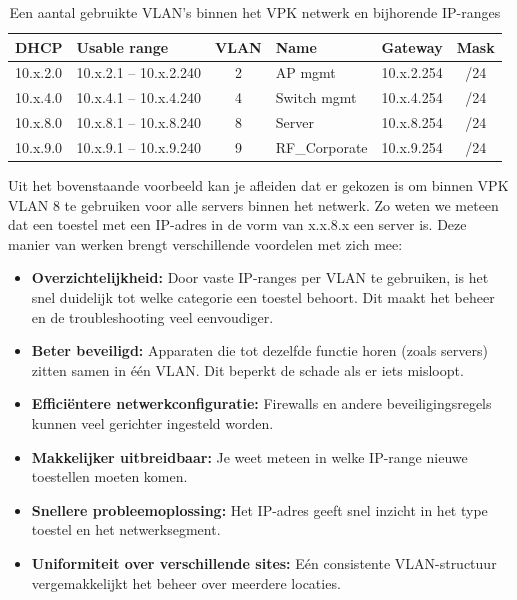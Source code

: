 \begin{table}[h!]
    \centering
    \begin{tabular}{|l|l|c|l|l|c|}
        \hline
        \textbf{DHCP} & \textbf{Usable range} & \textbf{VLAN} & \textbf{Name} & \textbf{Gateway} & \textbf{Mask} \\
        \hline
        10.x.2.0 & 10.x.2.1 -- 10.x.2.240 & 2 & AP mgmt & 10.x.2.254 & /24 \\
        10.x.4.0 & 10.x.4.1 -- 10.x.4.240 & 4 & Switch mgmt & 10.x.4.254 & /24 \\
        10.x.8.0 & 10.x.8.1 -- 10.x.8.240 & 8 & Server & 10.x.8.254 & /24 \\
        10.x.9.0 & 10.x.9.1 -- 10.x.9.240 & 9 & RF\_Corporate & 10.x.9.254 & /24 \\
        \hline
    \end{tabular}
    \caption{Een aantal gebruikte VLAN's binnen het VPK netwerk en bijhorende IP-ranges}
\end{table}

Uit het bovenstaande voorbeeld kan je afleiden dat er gekozen is om binnen VPK VLAN 8 te gebruiken voor alle servers binnen het netwerk. Zo weten we meteen dat een toestel met een IP-adres in de vorm van x.x.8.x een server is. Deze manier van werken brengt verschillende voordelen met zich mee:

\begin{itemize}
    \item \textbf{Overzichtelijkheid:} Door vaste IP-ranges per VLAN te gebruiken, is het snel duidelijk tot welke categorie een toestel behoort. Dit maakt het beheer en de troubleshooting veel eenvoudiger.
    \item \textbf{Beter beveiligd:} Apparaten die tot dezelfde functie horen (zoals servers) zitten samen in één VLAN. Dit beperkt de schade als er iets misloopt.
    \item \textbf{Efficiëntere netwerkconfiguratie:} Firewalls en andere beveiligingsregels kunnen veel gerichter ingesteld worden.
    \item \textbf{Makkelijker uitbreidbaar:} Je weet meteen in welke IP-range nieuwe toestellen moeten komen.
    \item \textbf{Snellere probleemoplossing:} Het IP-adres geeft snel inzicht in het type toestel en het netwerksegment.
    \item \textbf{Uniformiteit over verschillende sites:} Eén consistente VLAN-structuur vergemakkelijkt het beheer over meerdere locaties.
\end{itemize}

